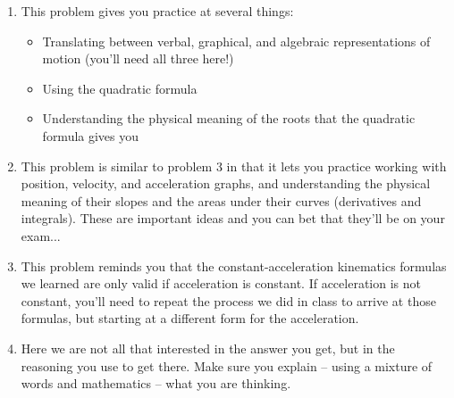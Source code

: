 \documentclass[12pt]{article}
\begin{document}
\begin{enumerate}
\item{This problem gives you practice at several things:}
\begin{itemize}
\item{Translating between verbal, graphical, and algebraic representations of motion (you'll need all three here!)}
\item{Using the quadratic formula}
\item{Understanding the physical meaning of the roots that the quadratic formula gives you}
\end{itemize}

\item{This problem is similar to problem 3 in that it lets you practice working with position, velocity, and acceleration graphs, and 
understanding the physical meaning of their slopes and the areas under their curves (derivatives and integrals). These are important
ideas and you can bet that they'll be on your exam...}

\item{This problem reminds you that the constant-acceleration kinematics formulas we learned are only valid if acceleration is constant.
If acceleration is not constant, you'll need to repeat the process we did in class to arrive at those formulas, but starting 
at a different form for the acceleration.}

\item Here we are not all that interested in the answer you get, but in the reasoning you use to get there. Make sure you explain -- using a mixture of words and mathematics -- what you are thinking.

\end{enumerate}
\end{document}
